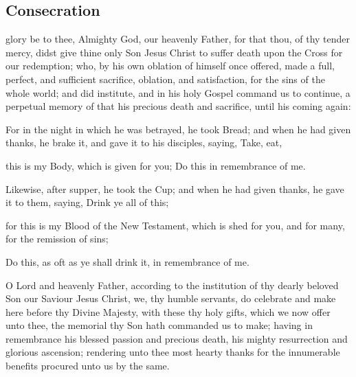 \subsection{Consecration}
 glory be to thee, Almighty God, our heavenly Father, for that thou, of thy tender mercy, didst give thine only Son Jesus Christ to suffer death upon the Cross for our redemption; who, by his own oblation of himself once offered, made a full, perfect, and sufficient sacrifice, oblation, and satisfaction, for the sins of the whole world; and did institute, and in his holy Gospel command us to continue, a perpetual memory of that his precious death and sacrifice, until his coming again:\\
\par
\noindent
For in the night in which he was betrayed, he took Bread; and when he had given thanks, he brake it, and gave it to his disciples, saying, Take, eat,
\begin{center}
\large{this is my Body, which is given for you; Do this in remembrance of me.}
\end{center}
Likewise, after supper, he took the Cup; and when he had given thanks, he gave it to them, saying, Drink ye all of this;
\begin{center}
\large{for this is my Blood of the New Testament, which is shed for you, and for many, for the remission of sins;}
\end{center}
Do this, as oft as ye shall drink it, in remembrance of me.\\
\par
{} O Lord and heavenly Father, according to the institution of thy dearly beloved Son our Saviour Jesus Christ, we, thy humble servants, do celebrate and make here before thy Divine Majesty, with these thy holy gifts, which we now offer unto thee, the memorial thy Son hath commanded us to make; having in remembrance his blessed passion and precious death, his mighty resurrection and glorious ascension; rendering unto thee most hearty thanks for the innumerable benefits procured unto us by the same.
